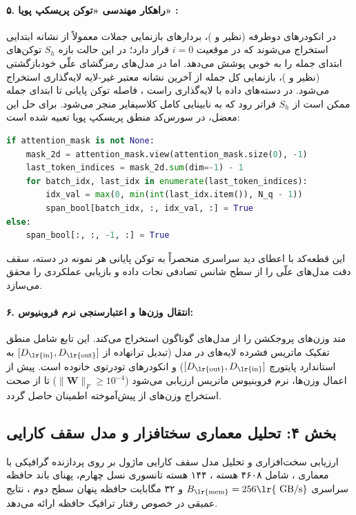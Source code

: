 \paragraph{۵. راهکار مهندسی «توکن پریسکپ پویا» :}
در انکودرهای دوطرفه (نظیر  و )، بردارهای بازنمایی جملات معمولاً از نشانه ابتدایی \lr{[CLS]} استخراج می‌شوند که در موقعیت $i=0$ قرار دارد؛ در این حالت بازه $S_h$ توکن‌های ابتدای جمله را به خوبی پوشش می‌دهد. اما در مدل‌های رمزگشای علّی خودبازگشتی (نظیر  و )، بازنمایی کل جمله از آخرین نشانه معتبر غیر-لایه لایه‌گذاری  استخراج می‌شود. در دسته‌های داده با لایه‌گذاری راست ، فاصله توکن پایانی تا ابتدای جمله ممکن است از $S_h$ فراتر رود که به نابینایی کامل کلاسیفایر منجر می‌شود.
برای حل این معضل، در سورس‌کد منطق پریسکپ پویا تعبیه شده است:
\begin{lstlisting}[language=Python]
if attention_mask is not None:
    mask_2d = attention_mask.view(attention_mask.size(0), -1)
    last_token_indices = mask_2d.sum(dim=-1) - 1
    for batch_idx, last_idx in enumerate(last_token_indices):
        idx_val = max(0, min(int(last_idx.item()), N_q - 1))
        span_bool[batch_idx, :, idx_val, :] = True
else:
    span_bool[:, :, -1, :] = True
\end{lstlisting}
این قطعه‌کد با اعطای دید سراسری منحصراً به توکن پایانی هر نمونه در دسته، سقف دقت مدل‌های علّی را از سطح شانس تصادفی نجات داده و بازیابی عملکردی را محقق می‌سازد.

\paragraph{۶. انتقال وزن‌ها و اعتبارسنجی نرم فروبنیوس:}
متد  وزن‌های پروجکشن را از مدل‌های گوناگون استخراج می‌کند. این تابع شامل منطق تفکیک ماتریس فشرده لایه‌های  در مدل  (تبدیل ترانهاده از $[D_{\text{\lr{in}}}, D_{\text{\lr{out}}}]$ به استاندارد پایتورچ $[D_{\text{\lr{out}}}, D_{\text{\lr{in}}}]$) و انکودرهای تودرتوی خانوده  است. پیش از اعمال وزن‌ها، نرم فروبنیوس ماتریس ارزیابی می‌شود ($\|\mathbf{W}\|_F \ge 10^{-4}$) تا از صحت استخراج وزن‌های از پیش‌آموخته اطمینان حاصل گردد.

\subsection*{بخش ۴: تحلیل معماری سختافزار و مدل سقف کارایی }
ارزیابی سخت‌افزاری و تحلیل مدل سقف کارایی  ماژول  بر روی پردازنده گرافیکی  با معماری ، شامل ۴۶۰۸ هسته ، ۱۴۴ هسته تانسوری نسل چهارم، پهنای باند حافظه سراسری $B_{\text{\lr{mem}}} = 256\text{\lr{ GB/s}}$ و ۳۲ مگابایت حافظه پنهان سطح دوم ، نتایج عمیقی در خصوص رفتار ترافیک حافظه ارائه می‌دهد.

